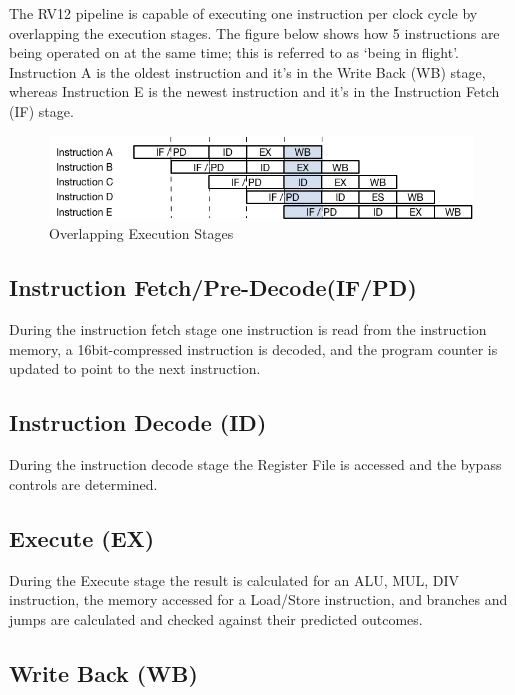 The RV12 pipeline is capable of executing one instruction per clock
cycle by overlapping the execution stages. The figure below shows how 5
instructions are being operated on at the same time; this is referred to
as `being in flight'. Instruction A is the oldest instruction and it's
in the Write Back (WB) stage, whereas Instruction E is the
newest instruction and it's in the Instruction Fetch (IF) stage.

\begin{figure}[hbt]
  \includegraphics{assets/img/Pipeline-Overlap.png}
  \caption{Overlapping Execution Stages}
\end{figure}

\subsection{Instruction Fetch/Pre-Decode(IF/PD)} \label{instruction-fetchpre-decode-ifpd}

During the instruction fetch stage one instruction is read from the
instruction memory, a 16bit-compressed instruction is decoded, and the
program counter is updated to point to the next instruction.

\subsection{Instruction Decode (ID)} \label{instruction-decode-id}

During the instruction decode stage the Register File is accessed and
the bypass controls are determined.

\subsection{Execute (EX)} \label{execute-ex}

During the Execute stage the result is calculated for an
ALU, MUL, DIV instruction, the memory accessed for a Load/Store instruction, and branches and jumps are calculated and checked against their predicted outcomes.

\subsection{Write Back (WB)} \label{write-back-wb}

